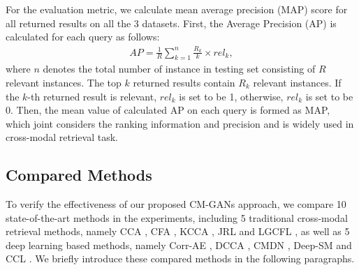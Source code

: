 \documentclass[journal]{IEEEtran}
\begin{document}
For the evaluation metric, we calculate mean average precision (MAP) score for all returned results on all the 3 datasets. First, the Average Precision (AP) is calculated for each query as follows:
\begin{align}
AP= \frac{1}{R}\sum_{k=1}^{n}\frac{R_{k}}{k}\times rel_{k},
\end{align}
where $n$ denotes the total number of instance in testing set consisting of $R$ relevant instances. The top $k$ returned results contain $R_k$ relevant instances. If the $k$-th returned result is relevant, $rel_k$ is set to be 1, otherwise, $rel_k$ is set to be 0. Then, the mean value of calculated AP on each query is formed as MAP, which joint considers the ranking information and precision and is widely used in cross-modal retrieval task.

\subsection{Compared Methods}

To verify the effectiveness of our proposed CM-GANs approach, we compare 10 state-of-the-art methods in the experiments, including 5 traditional cross-modal retrieval methods, namely CCA \cite{HotelingBiometrika36RelationBetweenTwoVariates}, CFA \cite{LiMM03CFA}, KCCA \cite{DBLP:journals/neco/HardoonSS04}, JRL \cite{ZhaiTCSVT2014JRL} and LGCFL \cite{DBLP:journals/tmm/KangXLXP15}, as well as 5 deep learning based methods, namely Corr-AE \cite{feng12014cross}, DCCA \cite{DBLP:conf/cvpr/YanM15}, CMDN \cite{DBLP:conf/ijcai/PengHQ16}, Deep-SM \cite{DBLP:journals/tcyb/WeiZLWLZY17} and CCL \cite{peng2017ccl}. We briefly introduce these compared methods in the following paragraphs.
\end{document}
